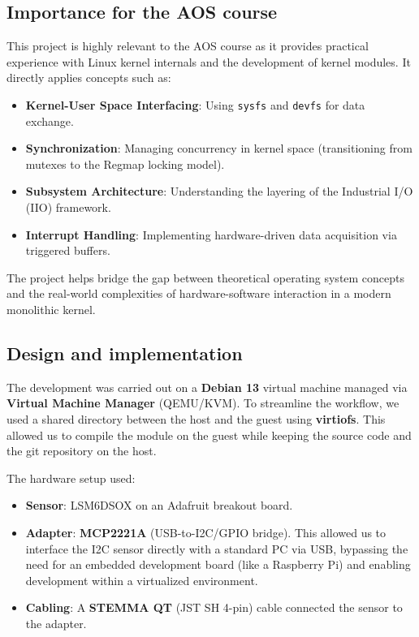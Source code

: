 \documentclass[10pt,a4paper]{article}
\begin{document}
\subsection{Importance for the AOS course}
This project is highly relevant to the AOS course as it provides practical experience with Linux kernel internals and the development of kernel modules. It directly applies concepts such as:
\begin{itemize}
    \item \textbf{Kernel-User Space Interfacing}: Using \texttt{sysfs} and \texttt{devfs} for data exchange.
    \item \textbf{Synchronization}: Managing concurrency in kernel space (transitioning from mutexes to the Regmap locking model).
    \item \textbf{Subsystem Architecture}: Understanding the layering of the Industrial I/O (IIO) framework.
    \item \textbf{Interrupt Handling}: Implementing hardware-driven data acquisition via triggered buffers.
\end{itemize}
The project helps bridge the gap between theoretical operating system concepts and the real-world complexities of hardware-software interaction in a modern monolithic kernel.

\subsection{Design and implementation}
The development was carried out on a \textbf{Debian 13} virtual machine managed via \textbf{Virtual Machine Manager} (QEMU/KVM). To streamline the workflow, we used a shared directory between the host and the guest using \textbf{virtiofs}. This allowed us to compile the module on the guest while keeping the source code and the git repository on the host.

The hardware setup used:
\begin{itemize}
    \item \textbf{Sensor}: LSM6DSOX on an Adafruit breakout board.
    \item \textbf{Adapter}: \textbf{MCP2221A} (USB-to-I2C/GPIO bridge). This allowed us to interface the I2C sensor directly with a standard PC via USB, bypassing the need for an embedded development board (like a Raspberry Pi) and enabling development within a virtualized environment.
    \item \textbf{Cabling}: A \textbf{STEMMA QT} (JST SH 4-pin) cable connected the sensor to the adapter.
\end{itemize}
\end{document}
